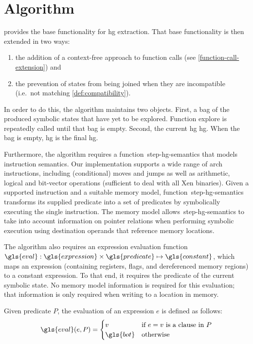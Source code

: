 \section{Algorithm}\label{sec:algorithm}
 provides the base functionality for \ac{hg} extraction.
That base functionality is then extended in two ways:
\begin{enumerate}
  \item the addition of a context-free approach to function calls (see \cref{function-call-extension}) and
  \item the prevention of states from being joined when they are incompatible (i.e.\ not matching \cref{def:compatibility}). 
\end{enumerate}
In order to do this, the algorithm maintains two objects.
First, a \gls{bag} of the produced symbolic states that have yet to be explored.
Function \gls{explore} is repeatedly called until that \gls{bag} is empty.
Second, the current \ac{hg} \gls{hg}.
When the \gls{bag} is empty, \gls{hg} is the final \ac{hg}.

Furthermore, the algorithm requires a function~\gls{step-hg-semantics} that models instruction semantics.
Our implementation supports a wide range of \gls{arch} instructions,
including (conditional) moves and jumps as well as
arithmetic, logical and bit-vector operations (sufficient to deal with all Xen binaries).
Given a supported instruction and a suitable memory model,
function~\gls{step-hg-semantics} transforms its supplied predicate
into a set of predicates 
by symbolically executing the single instruction.
The memory model allows~\gls{step-hg-semantics} to take into account information on pointer relations
when performing symbolic execution using destination operands
that reference memory locations.


The algorithm also requires an expression evaluation function
$\gls{eval}:\gls{expression}\times\gls{predicate}\mapsto\gls{constant}$,
which maps an expression (containing registers, flags, and dereferenced memory regions)
to a constant expression.
To that end, it requires the predicate of the current symbolic state.
No memory model information is required for this evaluation;
that information is only required when writing to a location in memory.
\begin{definition}\label{def:eval}
  Given predicate $P$,  the evaluation of an expression $e$ is defined as follows:
  \begin{equation*}
    \gls{eval}(e,P)=\begin{cases}
      v & \text{if $e = v$ is a clause in }P \\
      \gls{bot} & \text{otherwise}
    \end{cases}
  \end{equation*}
\end{definition}

